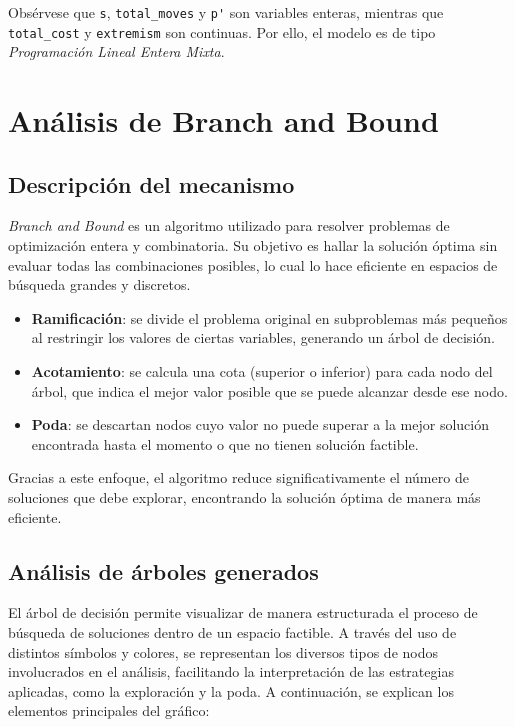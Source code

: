 Obsérvese que \texttt{s}, \texttt{total\_moves} y \texttt{p\'} son variables enteras, mientras que \texttt{total\_cost} y \texttt{extremism} son continuas. Por ello, el modelo es de tipo \emph{Programación Lineal Entera Mixta}.

\section{Análisis de Branch and Bound}


\subsection{Descripción del mecanismo}

\textit{Branch and Bound} es un algoritmo utilizado para resolver problemas de optimización entera y combinatoria. Su objetivo es hallar la solución óptima sin evaluar todas las combinaciones posibles, lo cual lo hace eficiente en espacios de búsqueda grandes y discretos.


\begin{itemize}
    \item \textbf{Ramificación}: se divide el problema original en subproblemas más pequeños al restringir los valores de ciertas variables, generando un árbol de decisión.

    \item \textbf{Acotamiento}: se calcula una cota (superior o inferior) para cada nodo del árbol, que indica el mejor valor posible que se puede alcanzar desde ese nodo.

    \item \textbf{Poda}: se descartan nodos cuyo valor no puede superar a la mejor solución encontrada hasta el momento o que no tienen solución factible.
\end{itemize}

Gracias a este enfoque, el algoritmo reduce significativamente el número de soluciones que debe explorar, encontrando la solución óptima de manera más eficiente.

\subsection{Análisis de árboles generados}

El árbol de decisión permite visualizar de manera estructurada el proceso de búsqueda de soluciones dentro de un espacio factible. A través del uso de distintos símbolos y colores, se representan los diversos tipos de nodos involucrados en el análisis, facilitando la interpretación de las estrategias aplicadas, como la exploración y la poda. A continuación, se explican los elementos principales del gráfico:

